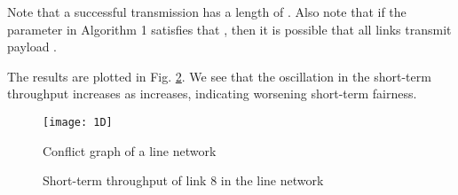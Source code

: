 \documentclass{IEEEtran}
\begin{document}
Note that a successful transmission has a length of .
Also note that if the parameter  in Algorithm 1 satisfies
that , then it is possible that all links
transmit payload .

The results are plotted in Fig. \ref{fig:st-line}. We see that the
oscillation in the short-term throughput increases as  increases,
indicating worsening short-term fairness.\begin{figure}
\begin{centering}
\texttt{[image: 1D]}
\par\end{centering}

\caption{\label{fig:1d}Conflict graph of a line network}

\end{figure}
\begin{figure}
\begin{centering}
\subfloat[]{\texttt{[image: 30\_50ms]}



}
\par\end{centering}

\begin{centering}
\subfloat[]{\texttt{[image: 50\_50ms]}

}
\par\end{centering}

\begin{centering}
\subfloat[]{\texttt{[image: 100\_50ms]}

}
\par\end{centering}

\begin{centering}
\subfloat[]{\texttt{[image: 150\_50ms]}

}
\par\end{centering}

\caption{\label{fig:st-line}Short-term throughput of link 8 in the line network}



\end{figure}
\end{document}
